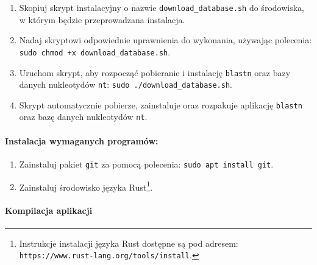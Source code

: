                 \begin{enumerate}
                    \item {
                        Skopiuj skrypt instalacyjny o nazwie \texttt{download\_database.sh} do środowiska, w którym będzie przeprowadzana instalacja.
                    }
                    \item {
                        Nadaj skryptowi odpowiednie uprawnienia do wykonania, używając polecenia: \texttt{sudo chmod +x download\_database.sh}.
                    }
                    \item {
                        Uruchom skrypt, aby rozpocząć pobieranie i instalację \texttt{blastn} oraz bazy danych nukleotydów \texttt{nt}: \texttt{sudo ./download\_database.sh}.
                    }
                    \item {
                        Skrypt automatycznie pobierze, zainstaluje oraz rozpakuje aplikację \texttt{blastn} oraz bazę danych nukleotydów \texttt{nt}.
                    }
                \end{enumerate}

            \paragraph{Instalacja wymaganych programów:}

                \begin{enumerate}
                    \item {
                        Zainstaluj pakiet \texttt{git} za pomocą polecenia: \texttt{sudo apt install git}.
                    }
                    \item {
                        Zainstaluj środowisko języka Rust\footnote{Instrukcje instalacji języka Rust dostępne są pod adresem: \texttt{https://www.rust-lang.org/tools/install}.}.
                    }
                \end{enumerate}

            \paragraph{Kompilacja aplikacji}
                
